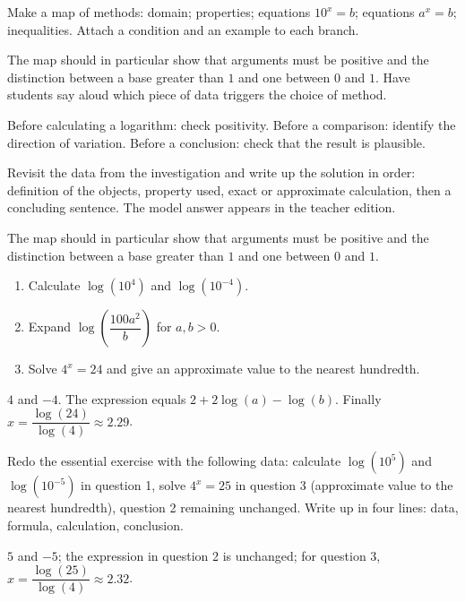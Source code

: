 \begin{activity}
Make a map of methods: domain; properties; equations $10^x=b$; equations $a^x=b$; inequalities. Attach a condition and an example to each branch.

\end{activity}
\begin{solution}The map should in particular show that arguments must be positive and the distinction between a base greater than $1$ and one between $0$ and $1$. Have students say aloud which piece of data triggers the choice of method.\end{solution}

\begin{summary}Before calculating a logarithm: check positivity. Before a comparison: identify the direction of variation. Before a conclusion: check that the result is plausible.\end{summary}

\begin{example}
Revisit the data from the investigation and write up the solution in order: definition of the objects, property used, exact or approximate calculation, then a concluding sentence. The model answer appears in the teacher edition.
\end{example}
\begin{solution}The map should in particular show that arguments must be positive and the distinction between a base greater than $1$ and one between $0$ and $1$.\end{solution}

\begin{exercise}[essential]
\begin{enumerate}\item Calculate $\log(10^4)$ and $\log(10^{-4})$.\item Expand $\log\!\left(\dfrac{100a^2}{b}\right)$ for $a,b>0$.\item Solve $4^x=24$ and give an approximate value to the nearest hundredth.\end{enumerate}
\end{exercise}
\begin{solution}$4$ and $-4$. The expression equals $2+2\log(a)-\log(b)$. Finally $x=\dfrac{\log(24)}{\log(4)}\approx\num{2,29}$.\end{solution}


\begin{homework}Redo the essential exercise with the following data: calculate $\log(10^{5})$ and $\log(10^{-5})$ in question 1, solve $4^x=25$ in question 3 (approximate value to the nearest hundredth), question 2 remaining unchanged. Write up in four lines: data, formula, calculation, conclusion.\end{homework}
\begin{solution}$5$ and $-5$; the expression in question 2 is unchanged; for question 3, $x=\dfrac{\log(25)}{\log(4)}\approx\num{2,32}$.\end{solution}

